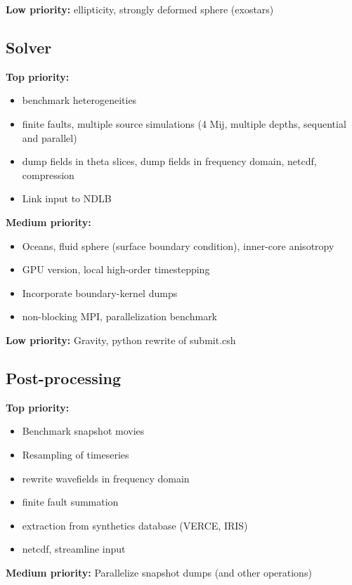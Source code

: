 \documentclass[11pt,letter,fleqn,english,notitlepage]{article}
\begin{document}
\noindent\textbf{Low priority:} ellipticity, strongly deformed sphere
(exostars)

\subsection{Solver}
\noindent\textbf{Top priority:} 
\begin{itemize}
    \item benchmark heterogeneities
    \item finite faults, multiple source simulations (4 Mij,
    multiple depths, sequential and parallel)
    \item dump fields in theta slices, dump fields in frequency domain,
      netcdf, compression
    \item Link input to NDLB
\end{itemize}

\noindent\textbf{Medium priority:}
\begin{itemize}
    \item Oceans, fluid sphere (surface boundary condition),
      inner-core anisotropy
    \item GPU version, local high-order timestepping
    \item Incorporate boundary-kernel dumps
    \item non-blocking MPI, parallelization benchmark

\end{itemize}

\noindent\textbf{Low priority:}
Gravity, python rewrite of submit.csh

\subsection{Post-processing}
\noindent\textbf{Top priority:} 
\begin{itemize}
    \item Benchmark snapshot movies
    \item Resampling of timeseries
    \item rewrite wavefields in frequency domain
    \item finite fault summation
    \item extraction from synthetics database (VERCE, IRIS)
    \item netcdf, streamline input
\end{itemize}

\noindent\textbf{Medium priority:}
Parallelize snapshot dumps (and other operations)\\
\end{document}

